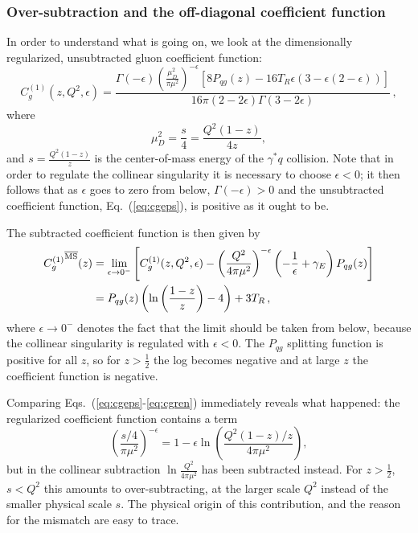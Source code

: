  
\subsubsection{Over-subtraction and the off-diagonal coefficient function}
\label{sec:offdiag}

In order to understand what is going on, we look at the dimensionally
regularized, unsubtracted gluon coefficient function:
\begin{equation}\label{eq:cgeps}
C^{(1)}_{g}(z,Q^2,\epsilon) = \frac{ \Gamma(-\epsilon)
  \left(\frac{\mu_D^2}{\pi\mu^2}\right)^{-\epsilon} \left[8P_{qg}(z)-16 T_R \epsilon (3
    -\epsilon(2 -\epsilon) )  \right]  }{16\pi (2 - 2\epsilon) \Gamma (3 - 2 \epsilon)}\,,
\end{equation}
where
\begin{equation}\label{eq:mud}
  \mu_D^2=\frac{s}{4}=\frac{Q^2(1-z)}{4z},
\end{equation} 
and  $s=\frac{Q^2(1-z)}{z}$ is the center-of-mass energy of the
$\gamma^* q$ collision. 
Note that in order to regulate the collinear singularity it is
necessary to choose $\epsilon<0$; it then follows that  as $\epsilon$
goes to zero from below,
$\Gamma(-\epsilon)>0$ and
the unsubtracted coefficient function, Eq.~(\ref{eq:cgeps}), is positive as it ought to
be.

The subtracted \msbar{} coefficient function is then given by
\begin{align}\label{eq:cgren}
{C^{(1)}_{g}}^{{\overline{\textrm{{MS}}}}}(z) &= \lim_{\epsilon\to
  0^-}\left[C_{g}^{(1)}(z,Q^2,\epsilon) - \left(\frac{Q^2}{4\pi
      \mu^2}\right)^{-\epsilon} \left(-\frac 1
    {\epsilon}+\gamma_E\right) P_{qg}(z)\right]\\
    &= P_{qg}(z) \left( \ln\left(\frac{1-z}{z}\right) - 4 \right) + 3
    T_R \, ,\label{eq:cgnlo}
\end{align}
where  $\epsilon\to 0^-$ denotes the fact that the limit should be
taken from below, because the collinear singularity is regulated with
$\epsilon<0$. 
The $P_{qg}$ splitting function is positive for all $z$, so for
$z>\frac{1}{2}$ the log  becomes negative and at large $z$ the
coefficient function is negative.


Comparing  Eqs.~(\ref{eq:cgeps}-\ref{eq:cgren}) immediately reveals
what happened:  the regularized coefficient function contains a term
\begin{equation}\label{eq:logexp}
  \left(\frac{s/4}{\pi\mu^2}\right)^{-\epsilon}=1-\epsilon \ln \left(\frac{Q^2(1-z)/z}{4\pi\mu^2}\right),
\end{equation}
but in the collinear subtraction $\ln \frac{Q^2}{4\pi\mu^2}$ has been
subtracted instead. For $z>\frac{1}{2}$, $s<Q^2$ this
amounts to over-subtracting, at the larger scale $Q^2$ instead of the
smaller physical scale $s$. The physical origin of this contribution,
and the reason for the mismatch are easy to trace.

